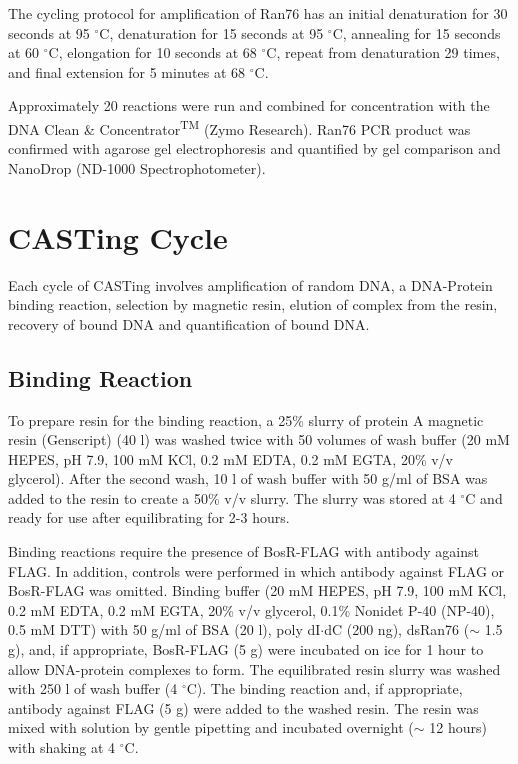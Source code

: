 \documentclass[12pt,twoside]{reedthesis}
\begin{document}
The cycling protocol for amplification of Ran76 has an initial denaturation for 30 seconds at 95 $^{\circ}$C, denaturation for 15 seconds at 95 $^{\circ}$C, annealing for 15 seconds at 60 $^{\circ}$C, elongation for 10 seconds at 68 $^{\circ}$C, repeat from denaturation 29 times, and final extension for 5 minutes at 68 $^{\circ}$C. 

Approximately 20 reactions were run and combined for concentration with the DNA Clean \& Concentrator\textsuperscript{TM} (Zymo Research). Ran76 PCR product was confirmed with agarose gel electrophoresis and quantified by gel comparison and NanoDrop\textsuperscript{\textregistered} (ND-1000 Spectrophotometer). 


\section{CASTing Cycle}
Each cycle of CASTing involves amplification of random DNA, a DNA-Protein binding reaction, selection by magnetic resin, elution of complex from the resin, recovery of bound DNA and quantification of bound DNA. 
\subsection{Binding Reaction}
To prepare resin for the binding reaction, a 25\% slurry of protein A magnetic resin (Genscript\textsuperscript{\textregistered}) (40 \micro l) was washed twice with 50 volumes of wash buffer (20 mM HEPES, pH 7.9, 100 mM KCl, 0.2 mM EDTA, 0.2 mM EGTA, 20\% v/v glycerol). After the second wash, 10 \micro l of wash buffer with 50 \micro g/ml of BSA was added to the resin to create a 50\% v/v slurry. The slurry was stored at 4 $^{\circ}$C and ready for use after equilibrating for 2-3 hours. 

Binding reactions require the presence of BosR-FLAG with antibody against FLAG. In addition, controls were performed in which antibody against FLAG or BosR-FLAG was omitted. Binding buffer (20 mM HEPES, pH 7.9, 100 mM KCl, 0.2 mM EDTA, 0.2 mM EGTA, 20\% v/v glycerol, 0.1\% Nonidet P-40 (NP-40), 0.5 mM DTT) with 50 \micro g/ml of BSA (20 \micro l), poly dI$\cdot$dC (200 ng), dsRan76 ($\sim$ 1.5 \micro g), and, if appropriate, BosR-FLAG (5 \micro g) were incubated on ice for 1 hour to allow DNA-protein complexes to form. The equilibrated resin slurry was washed with 250 \micro l of wash buffer (4 $^{\circ}$C). The binding reaction and, if appropriate, antibody against FLAG (5 \micro g) were added to the washed resin. The resin was mixed with solution by gentle pipetting and incubated overnight ($\sim$ 12 hours) with shaking at 4 $^{\circ}$C. 
\end{document}
